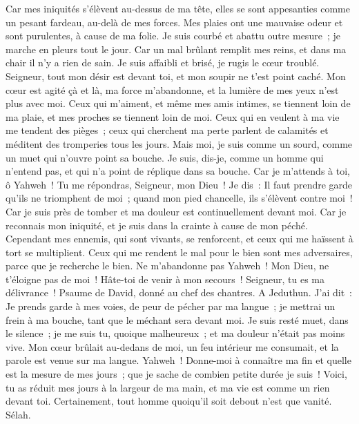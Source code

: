 \begin{multicols}{2}
Car mes iniquités s'élèvent au-dessus de ma tête, elles se sont appesanties comme un pesant fardeau, au-delà de mes forces.
Mes plaies ont une mauvaise odeur et sont purulentes, à cause de ma folie.
Je suis courbé et abattu outre mesure~; je marche en pleurs tout le jour.
Car un mal brûlant remplit mes reins, et dans ma chair il n'y a rien de sain.
Je suis affaibli et brisé, je rugis le cœur troublé.
Seigneur, tout mon désir est devant toi, et mon soupir ne t'est point caché.
Mon cœur est agité çà et là, ma force m'abandonne, et la lumière de mes yeux n'est plus avec moi.
Ceux qui m'aiment, et même mes amis intimes, se tiennent loin de ma plaie, et mes proches se tiennent loin de moi.
Ceux qui en veulent à ma vie me tendent des pièges~; ceux qui cherchent ma perte parlent de calamités et méditent des tromperies tous les jours.
Mais moi, je suis comme un sourd, comme un muet qui n'ouvre point sa bouche.
Je suis, dis-je, comme un homme qui n'entend pas, et qui n'a point de réplique dans sa bouche.
Car je m'attends à toi, ô Yahweh~! Tu me répondras, Seigneur, mon Dieu~!
Je dis~: Il faut prendre garde qu'ils ne triomphent de moi~; quand mon pied chancelle, ils s'élèvent contre moi~!
Car je suis près de tomber et ma douleur est continuellement devant moi.
Car je reconnais mon iniquité, et je suis dans la crainte à cause de mon péché.
Cependant mes ennemis, qui sont vivants, se renforcent, et ceux qui me haïssent à tort se multiplient.
Ceux qui me rendent le mal pour le bien sont mes adversaires, parce que je recherche le bien.
Ne m'abandonne pas Yahweh~! Mon Dieu, ne t'éloigne pas de moi~!
Hâte-toi de venir à mon secours~! Seigneur, tu es ma délivrance~!
\VerseOne{}Psaume de David, donné au chef des chantres. A Jeduthun.
J'ai dit~: Je prends garde à mes voies, de peur de pécher par ma langue~; je mettrai un frein à ma bouche, tant que le méchant sera devant moi.
Je suis resté muet, dans le silence~; je me suis tu, quoique malheureux~; et ma douleur n'était pas moins vive.
Mon cœur brûlait au-dedans de moi, un feu intérieur me consumait, et la parole est venue sur ma langue.
Yahweh~! Donne-moi à connaître ma fin et quelle est la mesure de mes jours~; que je sache de combien petite durée je suis~!
Voici, tu as réduit mes jours à la largeur de ma main, et ma vie est comme un rien devant toi. Certainement, tout homme quoiqu'il soit debout n'est que vanité. Sélah.

\end{multicols}
